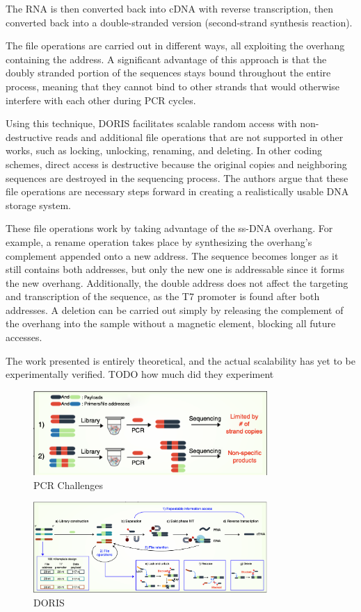 \documentclass[a4paper,conference]{IEEEtran}
\begin{document}
The RNA is then converted back into cDNA with reverse transcription, then converted back into a double-stranded version (second-strand synthesis reaction).

The file operations are carried out in different ways, all exploiting the overhang containing the address. A significant advantage of this approach is that the doubly stranded portion of the sequences stays bound throughout the entire process, meaning that they cannot bind to other strands that would otherwise interfere with each other during PCR cycles.

Using this technique, DORIS facilitates scalable random access with non-destructive reads and additional file operations that are not supported in other works, such as locking, unlocking, renaming, and deleting. In other coding schemes, direct access is destructive because the original copies and neighboring sequences are destroyed in the sequencing process. The authors argue that these file operations are necessary steps forward in creating a realistically usable DNA storage system.

These file operations work by taking advantage of the ss-DNA overhang. For example, a rename operation takes place by synthesizing the overhang's complement appended onto a new address. The sequence becomes longer as it still contains both addresses, but only the new one is addressable since it forms the new overhang. Additionally, the double address does not affect the targeting and transcription of the sequence, as the T7 promoter is found after both addresses. A deletion can be carried out simply by releasing the complement of the overhang into the sample without a magnetic element, blocking all future accesses.

The work presented is entirely theoretical, and the actual scalability has yet to be experimentally verified. TODO how much did they experiment

\begin{figure}[!t]
\centering
\includegraphics[width=3.5in]{pcrchallenges}
\caption{PCR Challenges}
\label{pcr_challenges}
\end{figure}

\begin{figure}[!t]
\centering
\includegraphics[width=3.5in]{doris}
\caption{DORIS}
\label{doris}
\end{figure}
\end{document}
